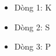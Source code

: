 \begin{itemize}
	\item     Dòng 1: K   
	\item     Dòng 2: S   
	\item     Dòng 3: P   
\end{itemize}